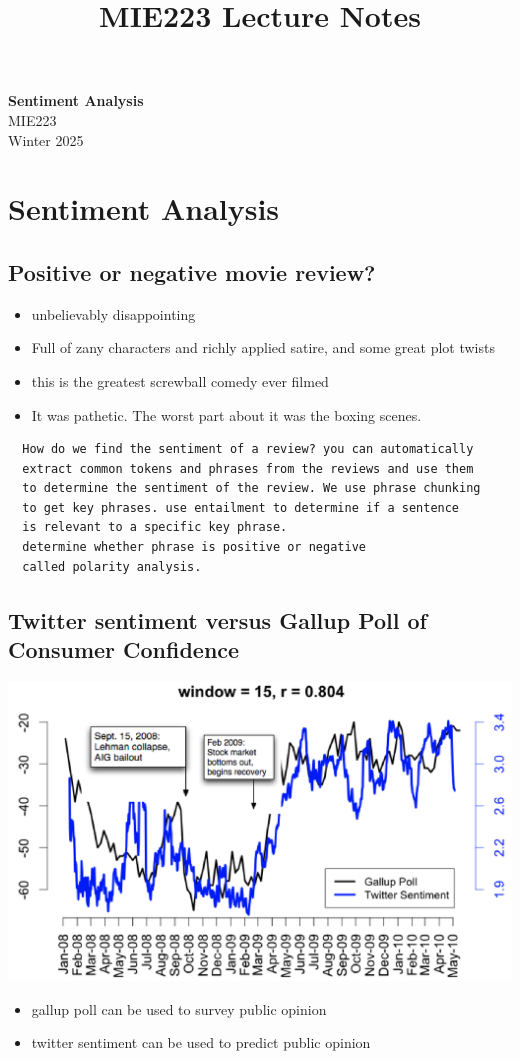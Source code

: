 \documentclass[11pt]{article}
\theoremstyle{definition}
\begin{document}
\setcounter{section}{0}
\title{MIE223 Lecture Notes}

\thispagestyle{empty}

\begin{center}
{\LARGE \bf Sentiment Analysis}\\
{\large MIE223}\\
Winter 2025
\end{center}
\section{Sentiment Analysis}
\subsection{Positive or negative movie review?}
\begin{itemize}
  \item unbelievably disappointing
  \item Full of zany characters and richly applied satire, and some
  great plot twists
  \item this is the greatest screwball comedy ever filmed
  \item It was pathetic. The worst part about it was the boxing
  scenes.
\end{itemize}

\begin{verbatim}
  How do we find the sentiment of a review? you can automatically 
  extract common tokens and phrases from the reviews and use them 
  to determine the sentiment of the review. We use phrase chunking 
  to get key phrases. use entailment to determine if a sentence 
  is relevant to a specific key phrase.
  determine whether phrase is positive or negative
  called polarity analysis.
\end{verbatim}

\subsection{Twitter sentiment versus Gallup Poll of
Consumer Confidence}
\includegraphics[width=\textwidth/2]{7.png}
\begin{itemize}
  \item gallup poll can be used to survey public opinion
  \item twitter sentiment can be used to predict public opinion
\end{itemize}
\end{document}
